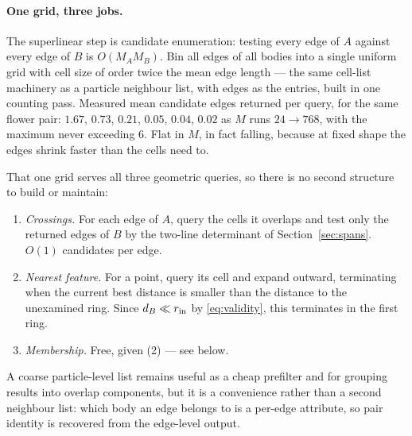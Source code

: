 \documentclass[11pt]{article}
\begin{document}
\paragraph{One grid, three jobs.} The superlinear step is candidate enumeration: testing every edge of $A$ against every edge of $B$ is $O(M_AM_B)$. Bin all edges of all bodies into a single uniform grid with cell size of order twice the mean edge length --- the same cell-list machinery as a particle neighbour list, with edges as the entries, built in one counting pass. Measured mean candidate edges returned per query, for the same flower pair: $1.67$, $0.73$, $0.21$, $0.05$, $0.04$, $0.02$ as $M$ runs $24\to768$, with the maximum never exceeding $6$. Flat in $M$, in fact falling, because at fixed shape the edges shrink faster than the cells need to.

That one grid serves all three geometric queries, so there is no second structure to build or maintain:
\begin{enumerate}\itemsep2pt
\item \emph{Crossings.} For each edge of $A$, query the cells it overlaps and test only the returned edges of $B$ by the two-line determinant of Section~\ref{sec:spans}. $O(1)$ candidates per edge.
\item \emph{Nearest feature.} For a point, query its cell and expand outward, terminating when the current best distance is smaller than the distance to the unexamined ring. Since $d_B\ll r_{\rm in}$ by \eqref{eq:validity}, this terminates in the first ring.
\item \emph{Membership.} Free, given (2) --- see below.
\end{enumerate}
A coarse particle-level list remains useful as a cheap prefilter and for grouping results into overlap components, but it is a convenience rather than a second neighbour list: which body an edge belongs to is a per-edge attribute, so pair identity is recovered from the edge-level output.
\end{document}
